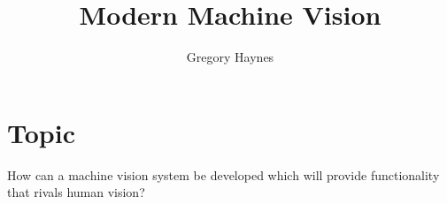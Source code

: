 \documentclass[a4paper,10pt]{article}
\title{Modern Machine Vision}
\author{Gregory Haynes}
\begin{document}
\maketitle

\section*{Topic}
How can a machine vision system be developed which will provide functionality that rivals human vision?

\nocite{*}



\end{document}
